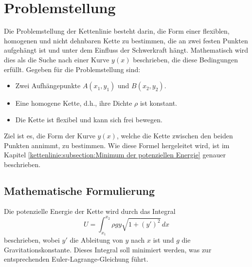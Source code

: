 %
%
%
%
\section{Problemstellung\label{kettenlinie:section:Problemstellung}}
Die Problemstellung der Kettenlinie besteht darin, die Form einer flexiblen, homogenen und nicht dehnbaren Kette zu bestimmen, die an zwei festen Punkten aufgehängt ist und unter dem Einfluss der Schwerkraft hängt.
Mathematisch wird dies als die Suche nach einer Kurve \( y(x) \) beschrieben, die diese Bedingungen erfüllt.
Gegeben für die Problemstellung sind: 
\begin{itemize}
\item
Zwei Aufhängepunkte \( A(x_1, y_1) \) und \( B(x_2, y_2) \).
\item
Eine homogene Kette, d.h., ihre Dichte \( \rho \) ist konstant.
\item
Die Kette ist flexibel und kann sich frei bewegen.
\end{itemize}
Ziel ist es, die Form der Kurve \( y(x) \), welche die Kette zwischen den beiden Punkten annimmt, zu bestimmen.
Wie diese Formel hergeleitet wird, ist im Kapitel \ref{kettenlinie:subsection:Minimum der potenziellen Energie} genauer beschrieben.

\subsection{Mathematische Formulierung
\label{kettenlinie:subsection:Mathematische Formulierung}}
Die potenzielle Energie der Kette wird durch das Integral
\begin{equation}
	U = \int_{x_1}^{x_2} \rho g y \sqrt{1 + (y')^2} \, dx
\end{equation}
beschrieben, wobei \( y' \) die Ableitung von \( y \) nach \( x \) ist und \( g \) die Gravitationskonstante.
Dieses Integral soll minimiert werden, was zur entsprechenden Euler-Lagrange-Gleichung führt.


